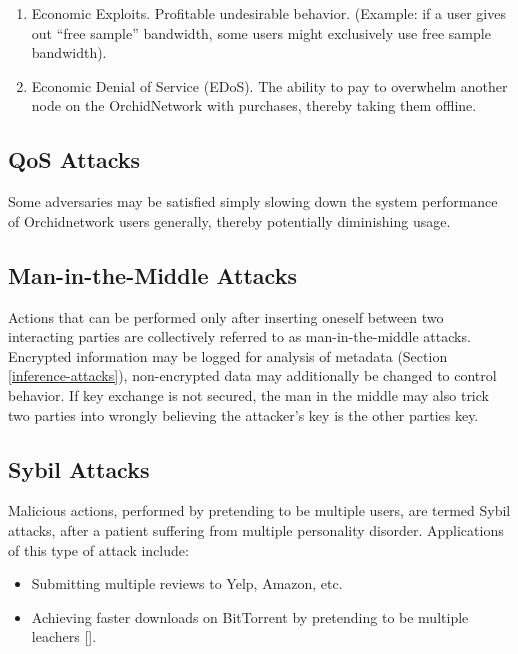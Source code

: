 \documentclass{article}
\newcommand{\orchid}{Orchid}
\newcommand{\Orchid}{\orchid}
\begin{document}
\begin{enumerate}
\item Economic Exploits. Profitable undesirable behavior. (Example: if a user gives out “free sample” bandwidth, some users might exclusively use free sample bandwidth).
\item Economic Denial of Service (EDoS). The ability to pay to overwhelm another node on the \Orchid Network with purchases, thereby taking them offline.
\end{enumerate}

\subsection{QoS Attacks}
\label{qos}

Some adversaries may be satisfied simply slowing down the system performance of \Orchid network users generally, thereby potentially diminishing usage.

\subsection{Man-in-the-Middle Attacks}
\label{mitm}

Actions that can be performed only after inserting oneself between two interacting parties are collectively referred to as man-in-the-middle attacks. Encrypted information may be logged for analysis of metadata (Section \ref{inference-attacks}), non-encrypted data may additionally be changed to control behavior. If key exchange is not secured, the man in the middle may also trick two parties into wrongly believing the attacker's key is the other parties key.

\subsection{Sybil Attacks}

Malicious actions, performed by pretending to be multiple users, are termed Sybil attacks, after a patient suffering from multiple personality disorder. Applications of this type of attack include:

\begin{itemize}
\item Submitting multiple reviews to Yelp, Amazon, etc.
\item Achieving faster downloads on BitTorrent by pretending to be multiple leachers [].
\end{itemize}
\end{document}
